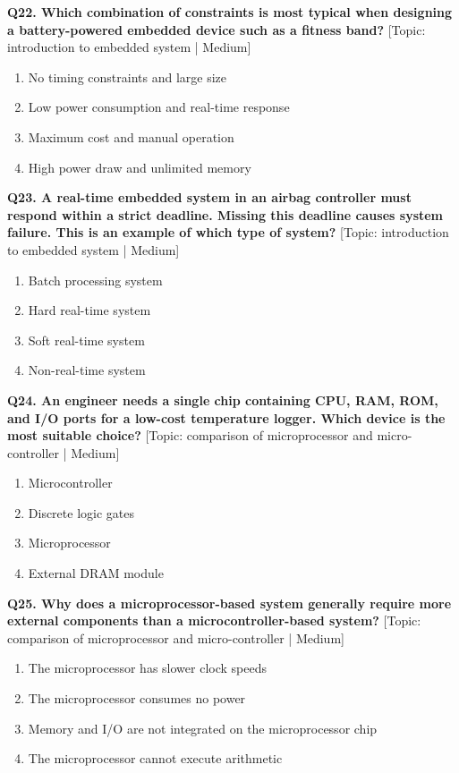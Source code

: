 \noindent\textbf{Q22. Which combination of constraints is most typical when designing a battery-powered embedded device such as a fitness band?} \hfill [Topic: introduction to embedded system | Medium]
\begin{enumerate}[label=(\alph*),topsep=2pt,itemsep=1pt,partopsep=0pt,parsep=0pt]
    \item {No timing constraints and large size}
    \item {Low power consumption and real-time response}
    \item {Maximum cost and manual operation}
    \item {High power draw and unlimited memory}
\end{enumerate}
\vspace{2mm}

\noindent\textbf{Q23. A real-time embedded system in an airbag controller must respond within a strict deadline. Missing this deadline causes system failure. This is an example of which type of system?} \hfill [Topic: introduction to embedded system | Medium]
\begin{enumerate}[label=(\alph*),topsep=2pt,itemsep=1pt,partopsep=0pt,parsep=0pt]
    \item {Batch processing system}
    \item {Hard real-time system}
    \item {Soft real-time system}
    \item {Non-real-time system}
\end{enumerate}
\vspace{2mm}

\noindent\textbf{Q24. An engineer needs a single chip containing CPU, RAM, ROM, and I/O ports for a low-cost temperature logger. Which device is the most suitable choice?} \hfill [Topic: comparison of microprocessor and micro-controller | Medium]
\begin{enumerate}[label=(\alph*),topsep=2pt,itemsep=1pt,partopsep=0pt,parsep=0pt]
    \item {Microcontroller}
    \item {Discrete logic gates}
    \item {Microprocessor}
    \item {External DRAM module}
\end{enumerate}
\vspace{2mm}

\noindent\textbf{Q25. Why does a microprocessor-based system generally require more external components than a microcontroller-based system?} \hfill [Topic: comparison of microprocessor and micro-controller | Medium]
\begin{enumerate}[label=(\alph*),topsep=2pt,itemsep=1pt,partopsep=0pt,parsep=0pt]
    \item {The microprocessor has slower clock speeds}
    \item {The microprocessor consumes no power}
    \item {Memory and I/O are not integrated on the microprocessor chip}
    \item {The microprocessor cannot execute arithmetic}
\end{enumerate}
\vspace{2mm}

